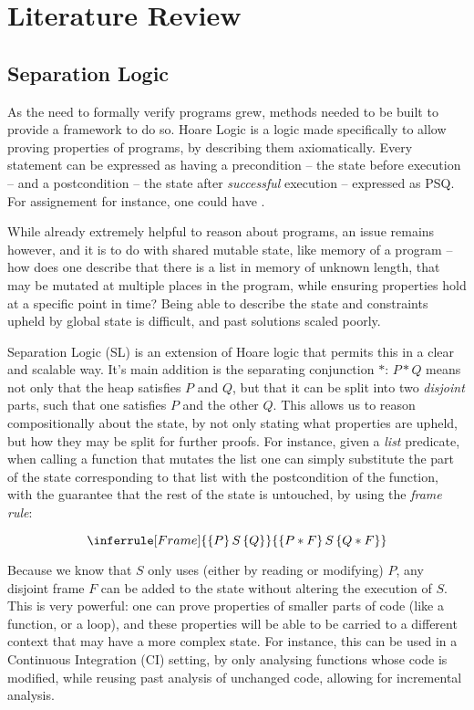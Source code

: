 \chapter{Literature Review}

\section{Separation Logic}

As the need to formally verify programs grew, methods needed to be built to provide a framework to do so. Hoare Logic \cite{hoarelogic} is a logic made specifically to allow proving properties of programs, by describing them axiomatically. Every statement can be expressed as having a precondition -- the state before execution -- and a postcondition -- the state after \emph{successful} execution -- expressed as \SLtriple PSQ. For assignement for instance, one could have .

While already extremely helpful to reason about programs, an issue remains however, and it is to do with shared mutable state, like memory of a program -- how does one describe that there is a list in memory of unknown length, that may be mutated at multiple places in the program, while ensuring properties hold at a specific point in time? Being able to describe the state and constraints upheld by global state is difficult, and past solutions scaled poorly.

Separation Logic (SL) \cite{seplogic1, seplogic2} is an extension of Hoare logic that permits this in a clear and scalable way. It's main addition is the separating conjunction $*$: $P * Q$ means not only that the heap satisfies $P$ and $Q$, but that it can be split into two \emph{disjoint} parts, such that one satisfies $P$ and the other $Q$. This allows us to reason compositionally about the state, by not only stating what properties are upheld, but how they may be split for further proofs. For instance, given a \emph{list} predicate, when calling a function that mutates the list one can simply substitute the part of the state corresponding to that list with the postcondition of the function, with the guarantee that the rest of the state is untouched, by using the \emph{frame rule}:

\[
\inferrule[Frame]
	{\SLtriple{P}{S}{Q}}
	{\SLtriple{P*F}{S}{Q*F}}
\]

Because we know that $S$ only uses (either by reading or modifying) $P$, any disjoint frame $F$ can be added to the state without altering the execution of $S$. This is very powerful: one can prove properties of smaller parts of code (like a function, or a loop), and these properties will be able to be carried to a different context that may have a more complex state. For instance, this can be used in a Continuous Integration (CI) setting, by only analysing functions whose code is modified, while reusing past analysis of unchanged code, allowing for incremental analysis.

